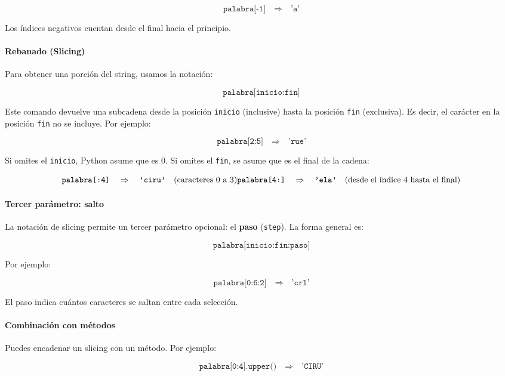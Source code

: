 \documentclass{article}
\theoremstyle{nonumberplain}
\begin{document}
\[
\texttt{palabra[-1]} \quad \Rightarrow \quad \texttt{'a'}
\]

Los índices negativos cuentan desde el final hacia el principio.

\paragraph{Rebanado (Slicing)}

Para obtener una porción del string, usamos la notación:

\[
\texttt{palabra[inicio:fin]}
\]

Este comando devuelve una subcadena desde la posición \texttt{inicio} (inclusive) hasta la posición \texttt{fin} (exclusiva). Es decir, el carácter en la posición \texttt{fin} no se incluye. Por ejemplo:

\[
\texttt{palabra[2:5]} \quad \Rightarrow \quad \texttt{'rue'}
\]

Si omites el \texttt{inicio}, Python asume que es 0. Si omites el \texttt{fin}, se asume que es el final de la cadena:

\[
\texttt{palabra[:4]} \quad \Rightarrow \quad \texttt{'ciru'} \quad (\text{caracteres 0 a 3}) \\
\texttt{palabra[4:]} \quad \Rightarrow \quad \texttt{'ela'} \quad (\text{desde el índice 4 hasta el final})
\]

\paragraph{Tercer parámetro: salto}

La notación de slicing permite un tercer parámetro opcional: el \textbf{paso} (\texttt{step}). La forma general es:

\[
\texttt{palabra[inicio:fin:paso]}
\]

Por ejemplo:

\[
\texttt{palabra[0:6:2]} \quad \Rightarrow \quad \texttt{'crl'}
\]

El paso indica cuántos caracteres se saltan entre cada selección.

\paragraph{Combinación con métodos}

Puedes encadenar un slicing con un método. Por ejemplo:

\[
\texttt{palabra[0:4].upper()} \quad \Rightarrow \quad \texttt{'CIRU'}
\]
\end{document}
